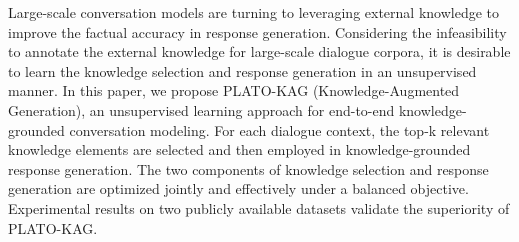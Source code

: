Large-scale conversation models are turning to leveraging external knowledge to improve the factual accuracy in response generation. Considering the infeasibility to annotate the external knowledge for large-scale dialogue corpora, it is desirable to learn the knowledge selection and response generation in an unsupervised manner. In this paper, we propose PLATO-KAG (Knowledge-Augmented Generation), an unsupervised learning approach for end-to-end knowledge-grounded conversation modeling. For each dialogue context, the top-k relevant knowledge elements are selected and then employed in knowledge-grounded response generation. The two components of knowledge selection and response generation are optimized jointly and effectively under a balanced objective. Experimental results on two publicly available datasets validate the superiority of PLATO-KAG.
